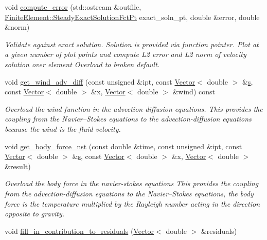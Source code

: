 \begin{DoxyCompactItemize}
void \hyperlink{classoomph_1_1RefineableBuoyantQCrouzeixRaviartElement_a078039343f5f9bb467a1183f725d1873}{compute\+\_\+error} (std\+::ostream \&outfile, \hyperlink{classoomph_1_1FiniteElement_a690fd33af26cc3e84f39bba6d5a85202}{Finite\+Element\+::\+Steady\+Exact\+Solution\+Fct\+Pt} exact\+\_\+soln\+\_\+pt, double \&error, double \&norm)
\begin{DoxyCompactList}\small\item\em Validate against exact solution. Solution is provided via function pointer. Plot at a given number of plot points and compute L2 error and L2 norm of velocity solution over element Overload to broken default. \end{DoxyCompactList}\item 
void \hyperlink{classoomph_1_1RefineableBuoyantQCrouzeixRaviartElement_a093f484b86df6e7cb59d4cc9e605fb51}{get\+\_\+wind\+\_\+adv\+\_\+diff} (const unsigned \&ipt, const \hyperlink{classoomph_1_1Vector}{Vector}$<$ double $>$ \&\hyperlink{cfortran_8h_ab7123126e4885ef647dd9c6e3807a21c}{s}, const \hyperlink{classoomph_1_1Vector}{Vector}$<$ double $>$ \&x, \hyperlink{classoomph_1_1Vector}{Vector}$<$ double $>$ \&wind) const
\begin{DoxyCompactList}\small\item\em Overload the wind function in the advection-\/diffusion equations. This provides the coupling from the Navier--Stokes equations to the advection-\/diffusion equations because the wind is the fluid velocity. \end{DoxyCompactList}\item 
void \hyperlink{classoomph_1_1RefineableBuoyantQCrouzeixRaviartElement_a69fb9113989d692dd55eb1983cdbc93b}{get\+\_\+body\+\_\+force\+\_\+nst} (const double \&time, const unsigned \&ipt, const \hyperlink{classoomph_1_1Vector}{Vector}$<$ double $>$ \&\hyperlink{cfortran_8h_ab7123126e4885ef647dd9c6e3807a21c}{s}, const \hyperlink{classoomph_1_1Vector}{Vector}$<$ double $>$ \&x, \hyperlink{classoomph_1_1Vector}{Vector}$<$ double $>$ \&result)
\begin{DoxyCompactList}\small\item\em Overload the body force in the navier-\/stokes equations This provides the coupling from the advection-\/diffusion equations to the Navier--Stokes equations, the body force is the temperature multiplied by the Rayleigh number acting in the direction opposite to gravity. \end{DoxyCompactList}\item 
void \hyperlink{classoomph_1_1RefineableBuoyantQCrouzeixRaviartElement_a102b3aeb79d9af430b9ce0a7c8d5bd33}{fill\+\_\+in\+\_\+contribution\+\_\+to\+\_\+residuals} (\hyperlink{classoomph_1_1Vector}{Vector}$<$ double $>$ \&residuals)

\end{DoxyCompactItemize}
